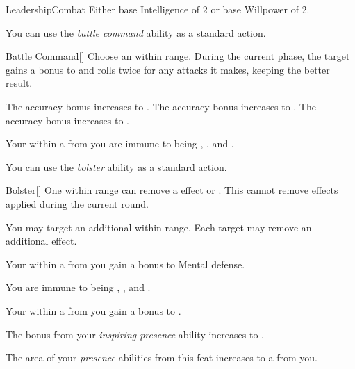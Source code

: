     \begin{feat}{Leadership}{Combat}
        \featpre Either base Intelligence of 2 or base Willpower of 2.

         You can use the \textit{battle command} ability as a standard action.
        \begin{freeability}{Battle Command}[]
            Choose an  within \rngmed range.
            During the current phase, the target gains a  bonus to  and rolls twice for any attacks it makes, keeping the better result.

            \rankline
             The accuracy bonus increases to .
             The accuracy bonus increases to .
             The accuracy bonus increases to .
        \end{freeability}

         Your  within a \arealarge {} from you are immune to being \shaken, \frightened, and \panicked.

         You can use the \textit{bolster} ability as a standard action.
        \begin{freeability}{Bolster}[]
            One  within \rngmed range can remove a  effect or .
            This cannot remove effects applied during the current round.

            \rankline
             You may target an additional  within range.
             Each target may remove an additional effect.
        \end{freeability}

         Your  within a \arealarge {} from you gain a  bonus to Mental defense.

         You are immune to being \shaken, \frightened, and \panicked.

         Your  within a \arealarge {} from you gain a  bonus to .

         The bonus from your \textit{inspiring presence} ability increases to .

         The area of your \textit{presence} abilities from this feat increases to a \gargarea {} from you.
    \end{feat}

